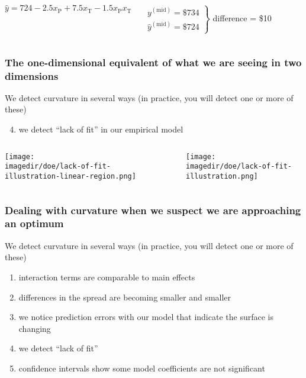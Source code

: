 \documentclass[handout,11pt,aspectratio=169,mathserif]{beamer}
\begin{document}
\begin{frame}
\begin{columns}[T]
{				\vspace{0.4cm}
				\scriptsize
				$\hat{y} = 724  -2.5 x_\text{P} +  7.5 x_\text{T} -1.5 x_\text{P}x_\text{T} $
				\normalsize
				
				\vspace{0.2cm}
				
				$\left.\begin{array}{c}
					y^{(\text{mid})} = \$ 734\\
					\hat{y}^{(\text{mid})} = \$ 724
				\end{array}\right\}$ {\scriptsize difference = \$10}
			}
	\end{columns}
\end{frame}

\begin{frame}\frametitle{The one-dimensional equivalent of what we are seeing in two dimensions}
	
	{\color{myOrange}We detect curvature in several ways (in practice, you will detect one or more of these)}
	
	\vspace{.7cm}
	\begin{enumerate}\setcounter{enumi}{3}
		\item	we detect ``lack of fit'' in our empirical model
	\end{enumerate}
	
	\begin{columns}[T]
			\centerline{\texttt{[image: \\imagedir/doe/lack-of-fit-illustration-linear-region.png]}}
			\rule[3mm]{0.01cm}{60mm}%
			\centerline{\texttt{[image: \\imagedir/doe/lack-of-fit-illustration.png]}}
	\end{columns}	
\end{frame}

\begin{frame}\frametitle{Dealing with curvature when we suspect we are approaching an optimum}
	{\color{myOrange}We detect curvature in several ways (in practice, you will detect one or more of these)}
	
	\vspace{.7cm}
	\begin{enumerate}
		\item	interaction terms are comparable to main effects
		\item	differences in the spread are becoming smaller and smaller
		\item	we notice prediction errors with our model that indicate the surface is changing
		\item	we detect ``lack of fit''
		\item	confidence intervals show some model coefficients are not significant
	\end{enumerate}
	
\end{frame}
\end{document}

